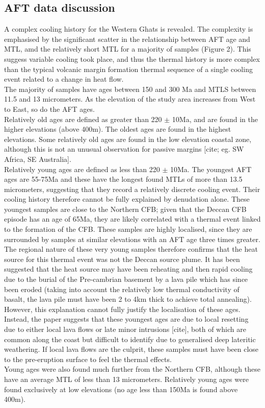 \documentclass[11pt, oneside]{article}   	%
\begin{document}
\subsection{AFT data discussion}
A complex cooling history for the Western Ghats is revealed. The complexity is emphasised by the significant scatter in the relationship between AFT age and MTL, amd the relatively short MTL for a majority of samples (Figure 2). This suggess variable cooling took place, and thus the thermal history is more complex than the typical volcanic margin formation thermal sequence of a single cooling event related to a change in heat flow. 
\\The majority of samples have ages between 150 and 300 Ma and MTLS between 11.5 and 13 micrometers. 
As the elevation of the study area increases from West to East, so do the AFT ages. \\Relatively old ages are defined as greater than 220 $\pm$ 10Ma, and are found in the higher elevations (above 400m). The oldest ages are found in the highest elevations. Some relatively old ages are found in the low elevation coastal zone, although this is not an unusual observation for passive margins [cite; eg. SW Africa, SE Australia]. 
\\Relatively young ages are defined as less than 220 $\pm$ 10Ma. 
The youngest AFT ages are 55-75Ma and these have the longest found MTLs of more than 13.5 micrometers, suggesting that they record a relatively discrete cooling event. Their cooling history therefore cannot be fully explained by denudation alone. These youngest samples are close to the Northern CFB; given that the Deccan CFB episode has an age of 65Ma, they are likely correlated with a thermal event linked to the formation of the CFB. These samples are highly localised, since they are surrounded by samples at similar elevations with an AFT age three times greater. The regional nature of these very young samples therefore confirms that the heat source for this thermal event was not the Deccan source plume. It has been suggested that the heat source may have been reheating and then rapid cooling due to the burial of the Pre-cambrian basement by a lava pile which has since been eroded (taking into account the relatively low thermal conductivity of basalt, the lava pile must have been 2 to 4km thick to achieve total annealing). However, this explanation cannot fully justify the localisation of these ages. Instead, the paper suggests that these youngest ages are due to local resetting due to either local lava flows or late minor intrusions [cite], both of which are common along the coast but difficult to identify due to generalised deep lateritic weathering. If local lava flows are the culprit, these samples must have been close to the pre-eruption surface to feel the thermal effects. 
\\Young ages were also found much further from the Northern CFB, although these have an average MTL of less than 13 micrometers. Relatively young ages were found exclusively at low elevations (no age less than 150Ma is found above 400m).
\end{document}
